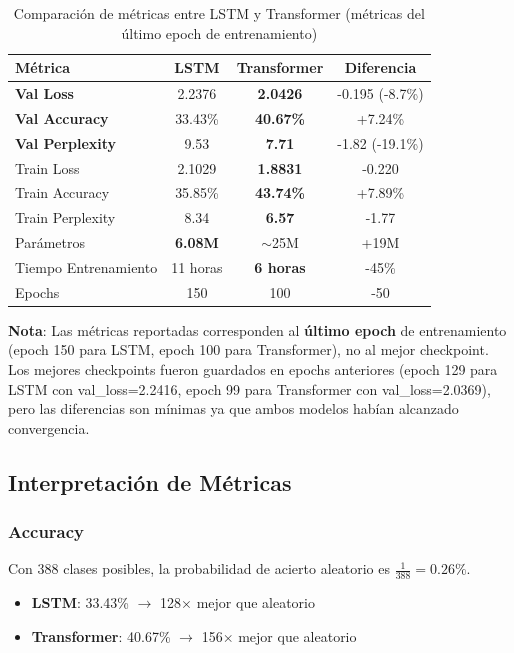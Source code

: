 \documentclass[12pt,a4paper]{article}
\begin{document}
\begin{table}[H]
\centering
\begin{tabular}{lccc}
\toprule
\textbf{Métrica} & \textbf{LSTM} & \textbf{Transformer} & \textbf{Diferencia} \\
\midrule
\textbf{Val Loss} & 2.2376 & \textbf{2.0426} & -0.195 (-8.7\%) \\
\textbf{Val Accuracy} & 33.43\% & \textbf{40.67\%} & +7.24\% \\
\textbf{Val Perplexity} & 9.53 & \textbf{7.71} & -1.82 (-19.1\%) \\
\midrule
Train Loss & 2.1029 & \textbf{1.8831} & -0.220 \\
Train Accuracy & 35.85\% & \textbf{43.74\%} & +7.89\% \\
Train Perplexity & 8.34 & \textbf{6.57} & -1.77 \\
\midrule
Parámetros & \textbf{6.08M} & $\sim$25M & +19M \\
Tiempo Entrenamiento & 11 horas & \textbf{6 horas} & -45\% \\
Epochs & 150 & 100 & -50 \\
\bottomrule
\end{tabular}
\caption{Comparación de métricas entre LSTM y Transformer (métricas del último epoch de entrenamiento)}
\label{tab:comparison}
\end{table}

\textbf{Nota}: Las métricas reportadas corresponden al \textbf{último epoch} de entrenamiento (epoch 150 para LSTM, epoch 100 para Transformer), no al mejor checkpoint. Los mejores checkpoints fueron guardados en epochs anteriores (epoch 129 para LSTM con val\_loss=2.2416, epoch 99 para Transformer con val\_loss=2.0369), pero las diferencias son mínimas ya que ambos modelos habían alcanzado convergencia.

\subsection{Interpretación de Métricas}

\subsubsection{Accuracy}
Con 388 clases posibles, la probabilidad de acierto aleatorio es $\frac{1}{388} = 0.26\%$.

\begin{itemize}
    \item \textbf{LSTM}: 33.43\% $\rightarrow$ 128$\times$ mejor que aleatorio
    \item \textbf{Transformer}: 40.67\% $\rightarrow$ 156$\times$ mejor que aleatorio
\end{itemize}
\end{document}
